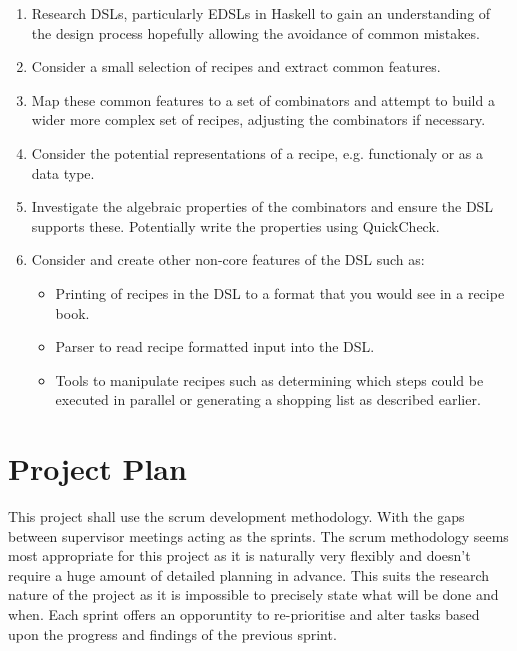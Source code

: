 \documentclass[12pt]{article}
\begin{document}
    \begin{enumerate}

        \item Research DSLs, particularly EDSLs in Haskell to gain
        an understanding of the design process hopefully allowing
        the avoidance of common mistakes.

        \item Consider a small selection of recipes and extract
        common features.

        \item Map these common features to a set of combinators
        and attempt to build a wider more complex set of recipes,
        adjusting the combinators if necessary.

        \item Consider the potential representations of a recipe,
        e.g. functionaly or as a data type.

        \item Investigate the algebraic properties of the
        combinators and ensure the DSL supports these. Potentially
        write the properties using QuickCheck.

        \item Consider and create other non-core features of the DSL
        such as:

            \begin{itemize}

                \item Printing of recipes in the DSL to a format that
                you would see in a recipe book.

                \item Parser to read recipe formatted input
                into the DSL.

                \item Tools to manipulate recipes such as determining
                which steps could be executed in parallel or generating
                a shopping list as described earlier.

            \end{itemize}

    \end{enumerate}

    \section{Project Plan}

    This project shall use the scrum development methodology. With the
    gaps between supervisor meetings acting as the sprints. The scrum
    methodology seems most appropriate for this project as it is naturally
    very flexibly and doesn't require a huge amount of detailed planning
    in advance. This suits the research nature of the project as it is
    impossible to precisely state what will be done and when. Each sprint
    offers an opporuntity to re-prioritise and alter tasks based upon
    the progress and findings of the previous sprint.
\end{document}
